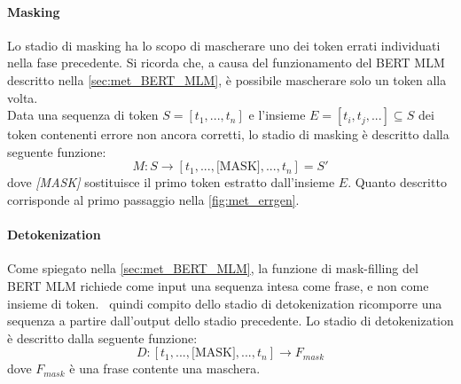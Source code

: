 \paragraph{Masking}
Lo stadio di masking ha lo scopo di mascherare uno dei token errati individuati nella fase precedente. Si ricorda che, a causa del funzionamento del BERT MLM descritto nella \autoref{sec:met_BERT_MLM}, è possibile mascherare solo un token alla volta.\\
Data una sequenza di token $S = [t_1,...,t_n]$ e l'insieme $E = [t_i,t_j,...]\subseteq S$ dei token contenenti errore non ancora corretti, lo stadio di masking è descritto dalla seguente funzione:
\begin{equation}
M: S \rightarrow [t_1,...,\text{[MASK]},...,t_n] = S\prime
\end{equation}
dove \textit{[MASK]} sostituisce il primo token estratto dall'insieme $E$. Quanto descritto corrisponde al primo passaggio nella \autoref{fig:met_errgen}.


\paragraph{Detokenization}
Come spiegato nella \autoref{sec:met_BERT_MLM}, la funzione di mask-filling del BERT MLM richiede come input una sequenza intesa come frase, e non come insieme di token. \E\ quindi compito dello stadio di detokenization ricomporre una sequenza a partire dall'output dello stadio precedente. Lo stadio di detokenization è descritto dalla seguente funzione:
\begin{equation}
D: [t_1,...,\text{[MASK]},...,t_n] \rightarrow F_{mask}
\end{equation}
dove $F_{mask}$ è una frase contente una maschera.

